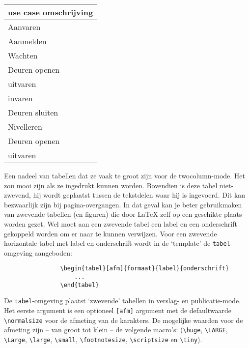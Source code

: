 		
		\begin{center}
			\begin{tabular}{|l||r|}
				\hline
				\multicolumn{2}{|c|}{use case omschrijving}\\
				\hline
				Aanvaren     & \the\paperwidth\\
				Aanmelden      & \the\textwidth\\
				Wachten    & \the\columnwidth\\
				Deuren openen & \the\columnsep\\
				uitvaren  & \the\oddsidemargin\\
				invaren & \the\evensidemargin\\
				Deuren sluiten    & \the\paperheight\\
				Nivelleren     & \the\textheight\\
				Deuren openen & \the\columnsep\\
				uitvaren  & \the\oddsidemargin\\
				
				\hline
			\end{tabular}
		\end{center}
		
		Een nadeel van tabellen dat ze vaak te groot zijn voor de
		twocolumn-mode. Het zou mooi zijn als ze ingedrukt kunnen
		worden. Bovendien is deze tabel niet-zwevend, hij wordt geplaatst
		tussen de tekstdelen waar hij is ingevoerd. Dit kan bezwaarlijk zijn
		bij pagina-overgangen. In dat geval kan je beter gebruikmaken van
		zwevende tabellen (en figuren) die door \LaTeX{} zelf op een geschikte
		plaats worden gezet. Wel moet aan een zwevende tabel een label en een
		onderschrift gekoppeld worden om er naar te kunnen verwijzen. Voor een
		zwevende horizontale tabel met label en onderschrift wordt in de
		`template' de \verb!tabel!-omgeving aangeboden:\\
		
		\begin{Aanpassen}
			\begin{verbatim}
				\begin{tabel}[afm]{formaat}{label}{onderschrift}
					...
				\end{tabel}
			\end{verbatim}
		\end{Aanpassen}
		
		
		De \verb!tabel!-omgeving plaatst `zwevende' tabellen in verslag- en
		publicatie-mode. Het eerste argument is een optioneel \verb![afm]!
		argument met de defaultwaarde \verb!\normalsize! voor de afmeting van
		de karakters. De mogelijke waarden voor de afmeting zijn -- van groot
		tot klein -- de volgende macro's: (\verb!\huge!, \verb!\LARGE!,
		\verb!\Large!, \verb!\large!, \verb!\small!, \verb!\footnotesize!,
		\verb!\scriptsize! en \verb!\tiny!).
		

